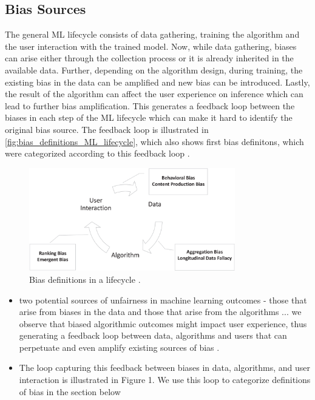 \begin{refsection}
		
			\subsection{Bias Sources}
		The general \gls{ML} lifecycle consists of data gathering, training the algorithm and the user interaction with the trained model. Now, while data gathering, biases can arise either through the collection process or it is already inherited in the available data. Further, depending on the algorithm design, during training, the existing bias in the data can be amplified and new bias can be introduced. Lastly, the result of the algorithm can affect the user experience on inference which can lead to further bias amplification. This generates a feedback loop between the biases in each step of the \gls{ML} lifecycle which can make it hard to identify the original bias source. The feedback loop is illustrated in \autoref{fig:bias_definitions_ML_lifecycle}, which also shows first bias definitons, which were categorized according to this feedback loop \autocite{Mehrabi_2021}.
		
		\begin{figure}[H]
			\centering
			\includegraphics[width=0.8\textwidth]{figures/BiasCategoriesInMLLifecycle.png}
			\caption{Bias definitions in a  lifecycle \autocite{Mehrabi_2021}.}
			\label{fig:bias_definitions_ML_lifecycle}
		\end{figure}
		
		\rawcitationusedstart
		\begin{itemize}
			\item two potential sources of unfairness in machine learning outcomes - those that arise from biases in the data and those that arise from the algorithms ... we observe that biased algorithmic outcomes might impact user experience, thus generating a feedback loop between data, algorithms and users that can perpetuate and even amplify existing sources of bias \autocite{Mehrabi_2021}.
			\item The loop capturing this feedback between biases in data, algorithms, and user interaction is illustrated in Figure 1. We use this loop to categorize definitions of bias in the section below \autocite{Mehrabi_2021}
		\end{itemize}
		\rawcitationusedend
		

\end{refsection}
